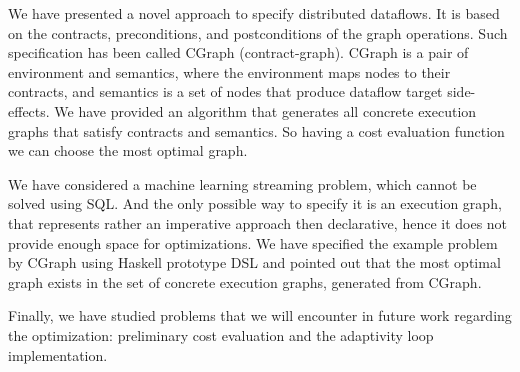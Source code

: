 We have presented a novel approach to specify distributed dataflows.
It is based on the contracts, preconditions, and postconditions of the graph operations.
Such specification has been called CGraph (contract-graph).
CGraph is a pair of environment and semantics, where the environment maps nodes to their contracts, and semantics is a set of nodes that produce dataflow target side-effects.
We have provided an algorithm that generates all concrete execution graphs that satisfy contracts and semantics.
So having a cost evaluation function we can choose the most optimal graph.

We have considered a machine learning streaming problem, which cannot be solved using SQL. %
And the only possible way to specify it is an execution graph, that represents rather an imperative approach then declarative, hence it does not provide enough space for optimizations.
We have specified the example problem by CGraph using Haskell prototype DSL and pointed out that the most optimal graph exists in the set of concrete execution graphs, generated from CGraph.


Finally, we have studied problems that we will encounter in future work regarding the optimization: preliminary cost evaluation and the adaptivity loop implementation.
